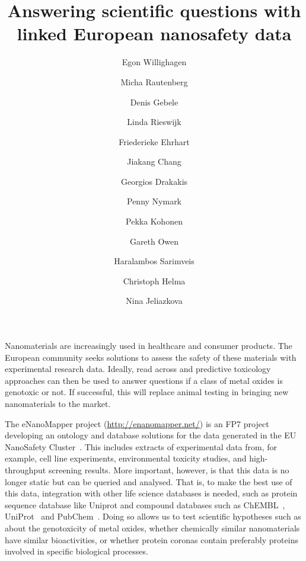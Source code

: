 \documentclass{llncs}
\begin{document}
\title{Answering scientific questions with linked European nanosafety data}

\author{
  Egon Willighagen \and
  Micha Rautenberg \and
  Denis Gebele \and
  Linda Rieswijk \and
  Friederieke Ehrhart \and
  Jiakang Chang \and
  Georgios Drakakis \and
  Penny Nymark \and
  Pekka Kohonen \and
  Gareth Owen \and
  Haralambos Sarimveis \and
  Christoph Helma \and
  Nina Jeliazkova
}


\maketitle

Nanomaterials are increasingly used in healthcare and consumer products. The 
European community seeks solutions to assess the safety of these materials
with experimental research data. Ideally, read across and 
predictive toxicology approaches can then be used to answer questions if a class 
of metal oxides is genotoxic or not. If successful, this will replace animal 
testing in bringing new nanomaterials to the market.

The eNanoMapper project (\url{http://enanomapper.net/}) is an FP7 project developing
an ontology and database  solutions for the data generated in the EU NanoSafety
Cluster~\cite{Hastings2015,Jeliazkova2015}. This
includes extracts of experimental data from, for example, cell line experiments, 
environmental toxicity studies, and high-throughput screening results. More 
important, however, is that this data is no longer static but can be queried and 
analysed. That is, to make the best use of this data, integration with other 
life science databases is needed, such as protein sequence database like Uniprot 
and compound databases such as ChEMBL~\cite{Willighagen2013}, 
UniProt~\cite{UniProt2014} and PubChem~\cite{Fu2015}. Doing so allows us to 
test scientific hypotheses such as about the genotoxicity of metal oxides, 
whether chemically similar nanomaterials have similar bioactivities, or whether 
protein coronas contain preferably proteins involved in specific biological 
processes.
\end{document}
